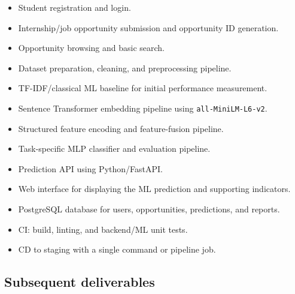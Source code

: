 \documentclass[11pt,a4paper]{article}
\begin{document}
\begin{itemize}[leftmargin=0.7cm]

    \item Student registration and login.

    \item Internship/job opportunity submission and opportunity ID generation.

    \item Opportunity browsing and basic search.

    \item Dataset preparation, cleaning, and preprocessing pipeline.

    \item TF-IDF/classical ML baseline for initial performance measurement.

    \item Sentence Transformer embedding pipeline using
    \texttt{all-MiniLM-L6-v2}.

    \item Structured feature encoding and feature-fusion pipeline.

    \item Task-specific MLP classifier and evaluation pipeline.

    \item Prediction API using Python/FastAPI.

    \item Web interface for displaying the ML prediction and supporting
    indicators.

    \item PostgreSQL database for users, opportunities, predictions, and
    reports.

    \item CI: build, linting, and backend/ML unit tests.

    \item CD to staging with a single command or pipeline job.
\end{itemize}

\subsection{Subsequent deliverables}
\end{document}
